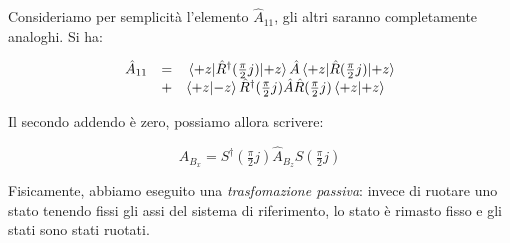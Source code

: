 Consideriamo per semplicit\`a l'elemento $\hat{A}_{11}$, gli altri saranno completamente analoghi. Si ha:

	\begin{equation}
		\begin{array}{r c l}
		\hat{A}_{11} & = & \mel{+z}{\hat{R}^\dagger ( \tfrac{\pi}{2} j )}{+z} \hat{A} \mel{+z}{\hat{R} ( \tfrac{\pi}{2} j )}{+z} \\
		& + & \braket{+z}{-z} \hat{R}^\dagger ( \tfrac{\pi}{2} j ) \hat{A} \hat{R} ( \tfrac{\pi}{2} j ) \braket{+z}{+z} \\
		\end{array}
	\end{equation}

Il secondo addendo \`e zero, possiamo allora scrivere:

	\begin{equation}
		\hat{A}_{B_x} =  S^\dagger ( \tfrac{\pi}{2} j ) \hat{A}_{B_z}  S ( \tfrac{\pi}{2} j ) 
	\end{equation}

Fisicamente, abbiamo eseguito una \textit{trasfomazione passiva}: invece di ruotare uno stato tenendo fissi gli assi del sistema di riferimento, lo stato \`e rimasto fisso e gli stati sono stati ruotati.
